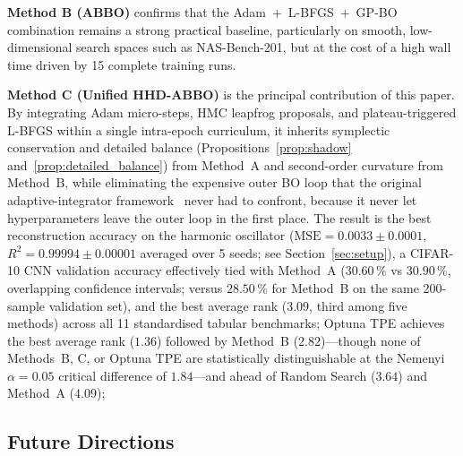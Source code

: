 \documentclass[11pt]{article}
\theoremstyle{definition}
\begin{document}
\textbf{Method B (ABBO)} confirms that the Adam~$+$~L-BFGS~$+$~GP-BO
combination remains a strong practical baseline, particularly on
smooth, low-dimensional search spaces such as NAS-Bench-201, but at
the cost of a high wall time driven by 15 complete training runs.

\textbf{Method C (Unified HHD-ABBO)} is the principal contribution of
this paper. By integrating Adam micro-steps, HMC leapfrog proposals,
and plateau-triggered L-BFGS within a single intra-epoch curriculum,
it inherits symplectic conservation and detailed balance
(Propositions~\ref{prop:shadow} and~\ref{prop:detailed_balance}) from
Method~A and second-order curvature from Method~B, while eliminating
the expensive outer BO loop that the original adaptive-integrator
framework~\cite{duruisseaux2021adaptive} never had to confront,
because it never let hyperparameters leave the outer loop in the
first place. The result is the best reconstruction accuracy on the
harmonic oscillator ($\mathrm{MSE}=0.0033 \pm 0.0001$, $R^2=0.99994 \pm 0.00001$
averaged over 5 seeds; see Section~\ref{sec:setup}),
a CIFAR-10 CNN validation accuracy effectively tied with Method~A
($30.60\,\%$ vs $30.90\,\%$, overlapping confidence intervals; versus
$28.50\,\%$ for
Method~B on the same 200-sample validation set), and the best average
rank ($3.09$, third among five methods) across all 11 standardised
tabular benchmarks; Optuna TPE achieves the best average rank
($1.36$) followed by Method~B ($2.82$)---though none of Methods~B,
C, or Optuna TPE are statistically distinguishable at the Nemenyi
$\alpha=0.05$ critical difference of $1.84$---and ahead of
Random Search ($3.64$) and Method~A ($4.09$);

\subsection*{Future Directions}
\end{document}
